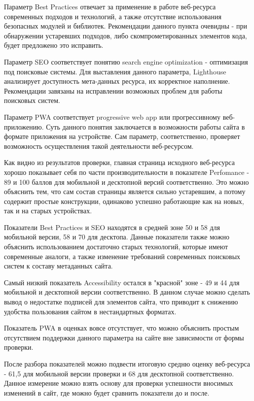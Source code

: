 Параметр Best Practices отвечает за применение в работе веб-ресурса современных подходов и технологий, а также отсутствие использования безопасных модулей и библиотек.
Рекомендации данного пункта очевидны - при обнаружении устаревших подходов, либо скомпрометированных элементов кода, будет предложено это исправить.

Параметр SEO соответствует понятию search engine optimization - оптимизация под поисковые системы.
Для выставления данного параметра, Lighthouse анализирует доступность мета-данных ресурса, их корректное наполнение.
Рекомендации завязаны на исправлении возможных проблем для работы поисковых систем.

Параметр PWA соответствует progressive web app или прогрессивному веб-приложению.
Суть данного понятия заключается в возможности работы сайта в формате приложения на устройстве.
Сам параметр, соответственно, проверяет возможность осуществления такой деятельности веб-ресурсом.

Как видно из результатов проверки, главная страница исходного веб-ресурса хорошо показывает себя по части производительности в показателе Perfomance - 89 и 100 баллов для мобильной и десктопной версий соответственно.
Это можно объяснить тем, что сам состав страницы является сильно устаревшим, а потому содержит простые конструкции, одинаково успешно работающие как на новых, так и на старых устройствах.

Показатели Best Practices и SEO находятся в средней зоне 50 и 58 для мобильной версии, 58 и 70 для десктопа.
Данные показатели также можно объяснить использованием достаточно старых технологий, которые имеют современные аналоги, а также изменение требований современных поисковых систем к составу метаданных сайта.

Самый низкий показатель Accessibility остался в "красной" зоне - 49 и 44 для мобильной и десктопной версии соответственно.
В данном случае можно сделать вывод о недостатке подписей для элементов сайта, что приводит к снижению удобства пользования сайтом в нестандартных форматах.

Показатель PWA в оценках вовсе отсутствует, что можно объяснить простым отсутствием поддержки данного параметра на сайте вне зависимости от формы проверки.

После разбора показателей можно подвести итоговую средню оценку веб-ресурса - 61,5 для мобильной версии проверки и 68 для десктопной соответственно.
Данное измерение можно взять основу для проверки успешности вносимых изменений в сайт, где можно будет сравнить показатели до и после.

